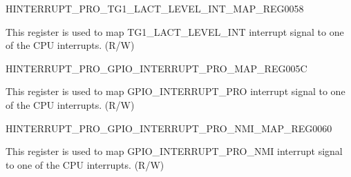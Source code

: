 \begin{register}{H}{INTERRUPT\_PRO\_TG1\_LACT\_LEVEL\_INT\_MAP\_REG}{\hexprefix{}0058}\label{regdesc:INTERRUPTPROTG1LACTLEVELINTMAPREG}
%
%
\regnewline%
\begin{regdesc}\begin{reglist}
\label{fielddesc:INTERRUPTPROTG1LACTLEVELINTMAP}\item [INTERRUPT\_PRO\_TG1\_LACT\_LEVEL\_INT\_MAP] This register is used to map TG1\_LACT\_LEVEL\_INT interrupt signal to one of the CPU interrupts. (R/W)
\end{reglist}\end{regdesc}
\end{register}


\begin{register}{H}{INTERRUPT\_PRO\_GPIO\_INTERRUPT\_PRO\_MAP\_REG}{\hexprefix{}005C}\label{regdesc:INTERRUPTPROGPIOINTERRUPTPROMAPREG}
%
%
\regnewline%
\begin{regdesc}\begin{reglist}
\label{fielddesc:INTERRUPTPROGPIOINTERRUPTPROMAP}\item [INTERRUPT\_PRO\_GPIO\_INTERRUPT\_PRO\_MAP] This register is used to map GPIO\_INTERRUPT\_PRO interrupt signal to one of the CPU interrupts. (R/W)
\end{reglist}\end{regdesc}
\end{register}


\begin{register}{H}{INTERRUPT\_PRO\_GPIO\_INTERRUPT\_PRO\_NMI\_MAP\_REG}{\hexprefix{}0060}\label{regdesc:INTERRUPTPROGPIOINTERRUPTPRONMIMAPREG}
%
%
\regnewline%
\begin{regdesc}\begin{reglist}
\label{fielddesc:INTERRUPTPROGPIOINTERRUPTPRONMIMAP}\item [INTERRUPT\_PRO\_GPIO\_INTERRUPT\_PRO\_NMI\_MAP] This register is used to map GPIO\_INTERRUPT\_PRO\_NMI interrupt signal to one of the CPU interrupts. (R/W)
\end{reglist}\end{regdesc}
\end{register}






